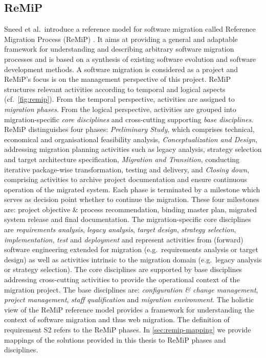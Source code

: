 \hypertarget{remip}{%
\subsection{ReMiP}\label{remip}}

Sneed et al.~introduce a reference model for software migration called Reference Migration Process (ReMiP) \autocite{Sneed2010ReMiP,Gipp2007ReMiP}.
It aims at providing a general and adaptable framework for understanding and describing arbitrary software migration processes and is based on a synthesis of existing software evolution and software development methods.
A software migration is considered as a project and ReMiP's focus is on the management perspective of this project.
ReMiP structures relevant activities according to temporal and logical aspects (cf.~\cref{fig:remip}).
From the temporal perspective, activities are assigned to \emph{migration phases}.
From the logical perspective, activities are grouped into migration-specific \emph{core disciplines} and cross-cutting supporting \emph{base disciplines}.
ReMiP distinguishes four phases: \emph{Preliminary Study}, which comprises technical, economical and organisational feasibility analysis, \emph{Conceptualization and Design}, addressing migration planning activities such as legacy analysis, strategy selection and target architecture specification, \emph{Migration and Transition}, conducting iterative package-wise transformation, testing and delivery, and \emph{Closing down}, comprising activities to archive project documentation and ensure continuous operation of the migrated system.
Each phase is terminated by a milestone which serves as decision point whether to continue the migration.
These four milestones are: project objective \& process recommendation, binding master plan, migrated system release and final documentation.
The migration-specific core disciplines are \emph{requirements analysis}, \emph{legacy analysis}, \emph{target design}, \emph{strategy selection}, \emph{implementation}, \emph{test} and \emph{deployment} and represent activities from (forward) software engineering extended for migration (e.g.~requirements analysis or target design) as well as activities intrinsic to the migration domain (e.g.~legacy analysis or strategy selection).
The core disciplines are supported by base disciplines addressing cross-cutting activities to provide the operational context of the migration project.
The base disciplines are: \emph{configuration \& change management}, \emph{project management}, \emph{staff qualification} and \emph{migration environment}.
The holistic view of the ReMiP reference model provides a framework for understanding the context of software migration and thus web migration.
The definition of requirement S2 refers to the ReMiP phases.
In \cref{sec:remip-mapping} we provide mappings of the solutions provided in this thesis to ReMiP phases and disciplines.

